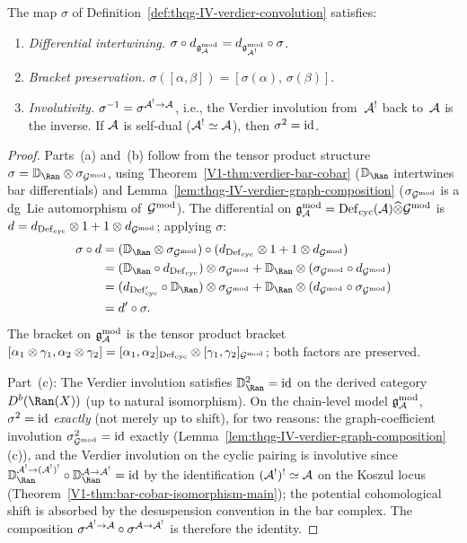 \begin{proposition}
\label{prop:thqg-IV-verdier-dg-lie}
The map $\sigma$ of
Definition~\textup{\ref{def:thqg-IV-verdier-convolution}} satisfies:
\begin{enumerate}[label=\textup{(\alph*)}]
\item \emph{Differential intertwining.}
 $\sigma \circ d_{\mathfrak{g}_{\mathcal{A}}^{\mathrm{mod}}} = d_{\mathfrak{g}_{\mathcal{A}^!}^{\mathrm{mod}}} \circ \sigma$.
\item \emph{Bracket preservation.}
 $\sigma([\alpha, \beta]) = [\sigma(\alpha),\, \sigma(\beta)]$.
\item \emph{Involutivity.}
 $\sigma^{-1} = \sigma^{\mathcal{A}^! \to \mathcal{A}}$, i.e., the Verdier involution
 from~$\mathcal{A}^!$ back to~$\mathcal{A}$ is the inverse.
 If $\mathcal{A}$ is self-dual ($\mathcal{A}^! \simeq \mathcal{A}$), then $\sigma^2 = \mathrm{id}$.
\end{enumerate}
\end{proposition}

\begin{proof}
Parts~(a) and~(b) follow from the tensor product structure
$\sigma = \VD_{\Ran} \otimes \sigma_{\Gmod}$, using
Theorem~\ref*{V1-thm:verdier-bar-cobar}
($\VD_{\Ran}$ intertwines bar differentials) and
Lemma~\ref{lem:thqg-IV-verdier-graph-composition}
($\sigma_{\mathcal{G}^{\mathrm{mod}}}$ is a dg~Lie automorphism of~$\mathcal{G}^{\mathrm{mod}}$).
The differential on $\mathfrak{g}_{\mathcal{A}}^{\mathrm{mod}} = \mathrm{Def}_{\mathrm{cyc}}(\mathcal{A}) \widehat{\otimes} \mathcal{G}^{\mathrm{mod}}$
is $d = d_{\mathrm{Def}_{\mathrm{cyc}}} \otimes 1 + 1 \otimes d_{\mathcal{G}^{\mathrm{mod}}}$; applying
$\sigma$:
\begin{align*}
\sigma \circ d
&= (\VD_{\Ran} \otimes \sigma_{\Gmod}) \circ
 (d_{\Defcyc} \otimes 1 + 1 \otimes d_{\Gmod}) \\
&= (\VD_{\Ran} \circ d_{\Defcyc}) \otimes \sigma_{\Gmod}
 + \VD_{\Ran} \otimes (\sigma_{\Gmod} \circ d_{\Gmod}) \\
&= (d_{\Defcyc'} \circ \VD_{\Ran}) \otimes \sigma_{\Gmod}
 + \VD_{\Ran} \otimes (d_{\Gmod} \circ \sigma_{\Gmod}) \\
&= d' \circ \sigma.
\end{align*}
The bracket on $\mathfrak{g}_{\mathcal{A}}^{\mathrm{mod}}$ is the tensor product bracket
$[\alpha_1 \otimes \gamma_1, \alpha_2 \otimes \gamma_2]
= [\alpha_1, \alpha_2]_{\mathrm{Def}_{\mathrm{cyc}}} \otimes [\gamma_1, \gamma_2]_{\mathcal{G}^{\mathrm{mod}}}$;
both factors are preserved.

Part~(c): The Verdier involution satisfies
$\VD_{\Ran}^2 = \id$ on the derived category $D^b(\Ran(X))$
(up to natural isomorphism). On the chain-level model
$\mathfrak{g}_{\mathcal{A}}^{\mathrm{mod}}$, $\sigma^2 = \mathrm{id}$ \emph{exactly} (not merely up to
shift), for two reasons: the graph-coefficient involution
$\sigma_{\mathcal{G}^{\mathrm{mod}}}^2 = \mathrm{id}$ exactly
(Lemma~\ref{lem:thqg-IV-verdier-graph-composition}(c)),
and the Verdier involution on the cyclic pairing is involutive
since $\VD_{\Ran}^{\cA^! \to (\cA^!)^!} \circ
\VD_{\Ran}^{\cA \to \cA^!} = \id$ by the identification
$(\mathcal{A}^!)^! \simeq \mathcal{A}$ on the Koszul locus
(Theorem~\ref*{V1-thm:bar-cobar-isomorphism-main}); the
potential cohomological shift is absorbed by the desuspension
convention in the bar complex.
The composition
$\sigma^{\mathcal{A}^! \to \mathcal{A}} \circ \sigma^{\mathcal{A} \to \mathcal{A}^!}$ is therefore
the identity.
\end{proof}

